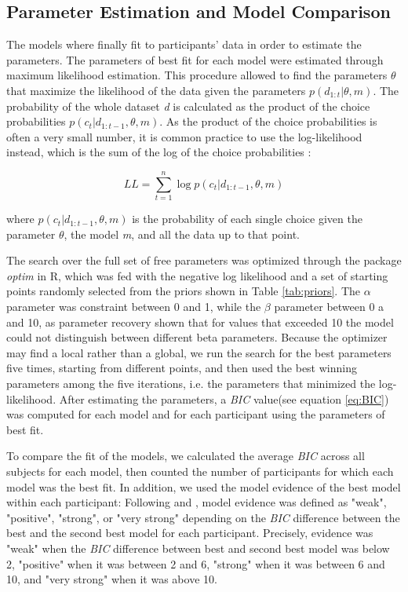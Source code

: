 \documentclass[a4paper,12pt]{article} 			%
\begin{document}
\subsection{Parameter Estimation and Model Comparison}
The models where finally fit to participants' data in order to estimate the parameters. The parameters of best fit for each model were estimated through maximum likelihood estimation. This procedure allowed to find the parameters $\theta$ that maximize the likelihood of the data given the parameters $p(d_{1:t} | \theta, m )$. 
The probability of the whole dataset \textit{d} is calculated as the product of the choice probabilities $p(c_t | d_{1:t-1}, \theta, m)$. As the product of the choice probabilities is often a very small number, it is common practice to use the log-likelihood instead, which is the sum of the log of the choice probabilities \cite{Daw2011, Wilson2019a}:

\begin{equation}
LL = \sum_{t=1}^{n} \log{p(c_t | d_{1:t-1} , \theta, m)}
\end{equation}

\noindent
where $p(c_t | d_{1:t-1}, \theta, m)$ is the probability of each single choice given the parameter $\theta$, the model \textit{m}, and all the data up to that point. \par
The search over the full set of free parameters was optimized through the package \textit{optim} in R, which was fed with the negative log likelihood and a set of starting points randomly selected from the priors shown in Table \ref{tab:priors}. The $\alpha$ parameter was constraint between 0 and 1, while the $\beta$ parameter between 0 a and 10, as parameter recovery shown that for values that exceeded 10 the model could not distinguish between different beta parameters. Because the optimizer may find a local rather than a global, we run the search for the best parameters five times, starting from different points, and then used the best winning parameters among the five iterations, i.e. the parameters that minimized the log-likelihood. 
After estimating the parameters, a \textit{BIC} value(see equation \ref{eq:BIC}) was computed for each model and for each participant using the parameters of best fit. \par
To compare the fit of the models, we calculated the average \textit{BIC} across all subjects for each model, then counted the number of participants for which each model was the best fit. In addition, we used the model evidence of the best model within each participant: Following \cite{raftery1995bayesian} and \cite{gluth2017attraction}, model evidence was defined as "weak", "positive", "strong", or "very strong" depending on the \textit{BIC} difference between the best and the second best model for each participant. Precisely, evidence was "weak" when the \textit{BIC} difference between best and second best model was below 2, "positive" when it was between 2 and 6, "strong" when it was between 6 and 10, and "very strong" when it was above 10. 
\end{document}
